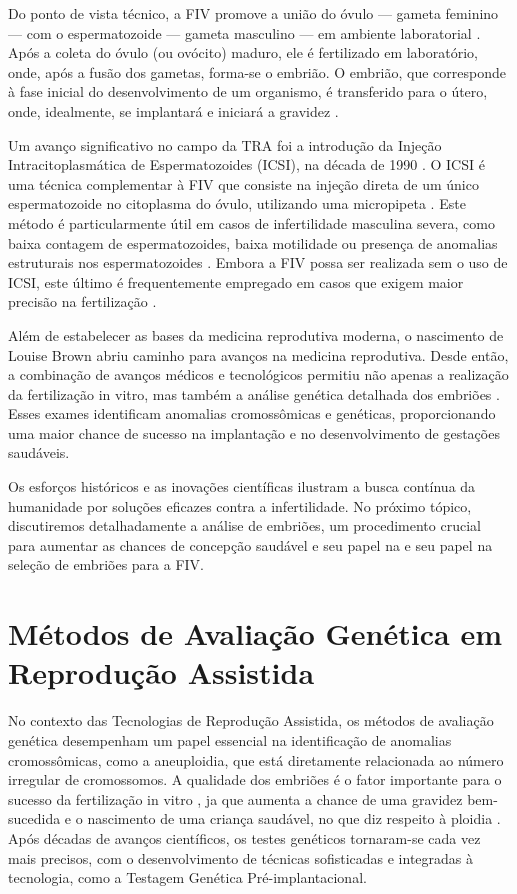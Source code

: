 Do ponto de vista técnico, a FIV promove a união do óvulo — gameta feminino — com o espermatozoide — gameta masculino — em ambiente laboratorial \cite{associacaobrasileira2024}. Após a coleta do óvulo (ou ovócito) maduro, ele é fertilizado em laboratório, onde, após a fusão dos gametas, forma-se o embrião. O embrião, que corresponde à fase inicial do desenvolvimento de um organismo, é transferido para o útero, onde, idealmente, se implantará e iniciará a gravidez \cite{associacaobrasileira2024}.

Um avanço significativo no campo da TRA foi a introdução da Injeção Intracitoplasmática de Espermatozoides (ICSI), na década de 1990 \cite{pereira2016}. O ICSI é uma técnica complementar à FIV que consiste na injeção direta de um único espermatozoide no citoplasma do óvulo, utilizando uma micropipeta \cite{pereira2016}. Este método é particularmente útil em casos de infertilidade masculina severa, como baixa contagem de espermatozoides, baixa motilidade ou presença de anomalias estruturais nos espermatozoides \cite{pereira2016}. Embora a FIV possa ser realizada sem o uso de ICSI, este último é frequentemente empregado em casos que exigem maior precisão na fertilização \cite{pereira2016}.

Além de estabelecer as bases da medicina reprodutiva moderna, o nascimento de Louise Brown abriu caminho para avanços na medicina reprodutiva. Desde então, a combinação de avanços médicos e tecnológicos permitiu não apenas a realização da fertilização in vitro, mas também a análise genética detalhada dos embriões \cite{moura2020}. Esses exames identificam anomalias cromossômicas e genéticas, proporcionando uma maior chance de sucesso na implantação e no desenvolvimento de gestações saudáveis.

Os esforços históricos e as inovações científicas ilustram a busca contínua da humanidade por soluções eficazes contra a infertilidade. No próximo tópico, discutiremos detalhadamente a análise de embriões, um procedimento crucial para aumentar as chances de concepção saudável e seu papel na e seu papel na seleção de embriões para a FIV.

\section{Métodos de Avaliação Genética em Reprodução Assistida}

No contexto das Tecnologias de Reprodução Assistida, os métodos de avaliação genética desempenham um papel essencial na identificação de anomalias cromossômicas, como a aneuploidia, que está diretamente relacionada ao número irregular de cromossomos. A qualidade dos embriões é o fator importante para o sucesso da fertilização in vitro \cite{wang2019}, ja que aumenta a chance de uma gravidez bem-sucedida e o nascimento de uma criança saudável, no que diz respeito à ploidia \cite{ramalho2024}. Após décadas de avanços científicos, os testes genéticos tornaram-se cada vez mais precisos, com o desenvolvimento de técnicas sofisticadas e integradas à tecnologia, como a Testagem Genética Pré-implantacional.

